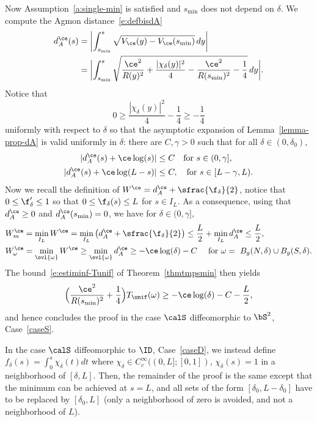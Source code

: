 Now Assumption~\ref{a:single-min} is satisfied and $s_{\min}$ does not depend on $\delta$. We compute the Agmon distance~\eqref{e:defbisdA}
\begin{align*}
d_A^{\ce}(s) & = \biggl| \int_{s_{\min}}^s \sqrt{ V_\ce(y)- V_\ce(s_{\min})}\, dy \biggr| \\
&= \biggl| \int_{s_{\min}}^s \sqrt{ \frac{\ce^2}{R(y)^2} + \frac{|\chi_\delta(y)|^2}{4}- \frac{\ce^2}{R(s_{\min})^2} - \frac14}\, dy \biggr|.
\end{align*}
Notice that
\[
0\geq \frac{|\chi_\delta(y)|^2}{4}- \frac14 \geq - \frac14
\]
uniformly with respect to $\delta$ so that the asymptotic expansion of Lemma~\ref{lemma-prop-dA} is valid uniformly in $\delta$: there are $C,\gamma>0$ such that for all $\delta \in (0,\delta_0)$,
\begin{align*}
|d_A^{\ce}(s) + \ce \log(s)| &\leq C \quad \text{for } s \in (0, \gamma ], \\
|d_A^{\ce}(s) + \ce \log (L-s) | &\leq C, \quad \text{for } s \in [L-\gamma, L). 
\end{align*}
Now we recall the definition of $W^{\ce} = d_A^{\ce} +\sfrac{\f_{\delta}}{2}$, notice that $0\leq \f'_{\delta}\leq 1$ so that $0\leq \f_{\delta}(s)\leq L$ for $s \in I_L$. As a consequence, using that $d_A^{\ce}\geq0$ and $d_A^{\ce}(s_{\min}) = 0$, we have for $\delta \in (0, \gamma ]$,
\begin{align*}
W^{\ce}_m & = \min_{I_L}W^{\ce} = \min_{I_L} \left( d_A^{\ce} +\sfrac{\f_{\delta}}{2} \right) \leq \frac{L}{2} + \min_{I_L} d_A^{\ce} \leq \frac{L}{2}, \\
W^{\ce}_{\omega} & = \min_{\ovl{\omega}}W^{\ce} \geq \min_{\ovl{\omega}} d_A^{\ce} \geq - \ce \log(\delta) - C \quad \text{ for }\omega = \ B_g(N, \delta) \cup B_g(S, \delta).
\end{align*}
The bound~\eqref{e:estiminf-Tunif} of Theorem~\ref{thmtmpsmin} then yields
\[
\Bigl( \frac{\ce^2}{R(s_{\min})^2} + \frac14 \Bigr) T_{\unif}(\omega)\geq - \ce \log(\delta) - C -\frac{L}{2},
\]
and hence concludes the proof in the case $\calS$ diffeomorphic to $\bS^2$, \ie Case~\ref{caseS}.

In the case $\calS$ diffeomorphic to $\ID$, \ie Case~\ref{caseD}, we instead define $f_\delta (s) = \int_0^s \chi_\delta (t) dt$ where $\chi_\delta \in C^\infty_c((0,L];[0,1])$, $\chi_\delta(s) =1$ in a neighborhood of $[\delta, L]$. Then, the remainder of the proof is the same except that the minimum can be achieved at $s=L$, and all sets of the form $[\delta_0, L-\delta_0]$ have to be replaced by $[\delta_0, L]$ (\ie only a neighborhood of zero is avoided, and not a neighborhood of $L$).
\enp

